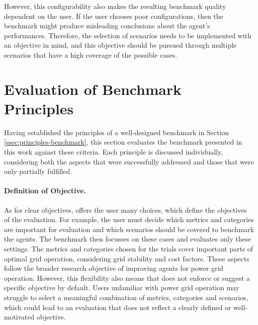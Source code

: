 However, this configurability also makes the resulting benchmark quality dependent on the user. If the user chooses poor configurations, then the benchmark might produce misleading conclusions about the agent's performances. Therefore, the selection of scenarios needs to be implemented with an objective in mind, and this objective should be pursued through multiple scenarios that have a high coverage of the possible cases.





\section{Evaluation of Benchmark Principles}\label{sec:evaluation-benchmark-principles}
Having established the principles of a well-designed benchmark in Section \ref{ssec:principles-benchmark}, this section evaluates the benchmark presented in this work against these criteria. Each principle is discussed individually, considering both the aspects that were successfully addressed and those that were only partially fulfilled.

\paragraph{Definition of Objective.}
As for clear objectives, \benchmark offers the user many choices, which define the objectives of the evaluation. For example, the user must decide which metrics and categories are important for evaluation and which scenarios should be covered to benchmark the agents. The benchmark then focusses on these cases and evaluates only these settings. The metrics and categories chosen for the trials cover important parts of optimal grid operation, considering grid stability and cost factors. These aspects follow the broader research objective of improving agents for power grid operation. However, this flexibility also means that \benchmark does not enforce or suggest a specific objective by default. Users unfamiliar with power grid operation may struggle to select a meaningful combination of metrics, categories and scenarios, which could lead to an evaluation that does not reflect a clearly defined or well-motivated objective.

